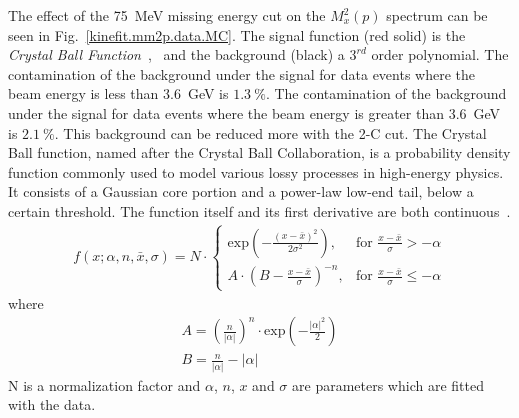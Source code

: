 The effect of the 75~MeV missing energy cut on the $M_x^2(p)$ spectrum can be seen in Fig.~\ref{kinefit.mm2p.data.MC}. The signal function (red solid) is the \emph{Crystal Ball Function}~\cite{CBwiki},~\cite{CBjlab} and the background (black) a $3^{rd}$ order polynomial. The contamination of the background under the \piz signal for data events where the beam energy is less than 3.6~GeV is $1.3~\%$. The contamination of the background under the \piz signal for data events where the beam energy is greater than 3.6~GeV is $2.1~\%$. This background can be reduced more with the 2-C cut. 
The Crystal Ball function, named after the Crystal Ball Collaboration, is a probability density function commonly used to model various lossy processes in high-energy physics. It consists of a Gaussian core portion and a power-law low-end tail, below a certain threshold. The function itself and its first derivative are both continuous~\cite{CBjlab}. 
\begin{align}
f(x;\alpha,n,\bar{x},\sigma)=N\cdot
\begin{cases}
\mathrm{exp}(-\frac{(x-\bar{x})^2}{2 \sigma^2}), & \text{for }\frac{x-\bar{x}}{\sigma}>-\alpha \\
A \cdot (B - \frac{x-\bar{x}}{\sigma})^{-n}, & \text{for }\frac{x-\bar{x}}{\sigma} \le -\alpha
\end{cases}
\end{align}
where
\begin{align}
A = \left( \frac{n}{\left| \alpha \right|}\right)^n \cdot \mathrm{exp} \left( - \frac{\left| \alpha \right|^2}{2}\right) \nonumber  \\
B=\frac{n}{\left| \alpha \right|} - \left| \alpha \right|
\end{align}
N is a normalization factor and $\alpha$, $n$, $x$ and $\sigma$ are parameters which are fitted with the data.
